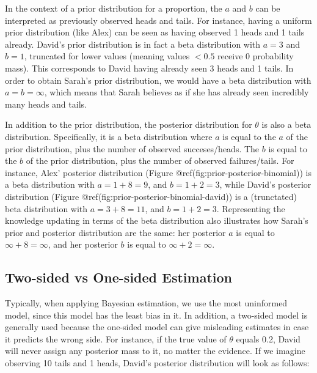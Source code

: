 \documentclass[
  letterpaper,
  DIV=11,
  numbers=noendperiod]{scrreprt}
\begin{document}
In the context of a prior distribution for a proportion, the \(a\) and
\(b\) can be interpreted as previously observed heads and tails. For
instance, having a uniform prior distribution (like Alex) can be seen as
having observed 1 heads and 1 tails already. David's prior distribution
is in fact a beta distribution with \(a = 3\) and \(b = 1\), truncated
for lower values (meaning values \(< 0.5\) receive 0 probability mass).
This corresponds to David having already seen 3 heads and 1 tails. In
order to obtain Sarah's prior distribution, we would have a beta
distribution with \(a = b = \infty\), which means that Sarah believes as
if she has already seen incredibly many heads and tails.

In addition to the prior distribution, the posterior distribution for
\(\theta\) is also a beta distribution. Specifically, it is a beta
distribution where \(a\) is equal to the \(a\) of the prior
distribution, plus the number of observed succeses/heads. The \(b\) is
equal to the \(b\) of the prior distribution, plus the number of
observed failures/tails. For instance, Alex' posterior distribution
(Figure @ref(fig:prior-posterior-binomial)) is a beta distribution with
\(a = 1 + 8 = 9\), and \(b = 1 + 2 = 3\), while David's posterior
distribution (Figure @ref(fig:prior-posterior-binomial-david)) is a
(trunctated) beta distribution with \(a = 3 + 8 = 11\), and
\(b = 1 + 2 = 3\). Representing the knowledge updating in terms of the
beta distribution also illustrates how Sarah's prior and posterior
distribution are the same: her posterior \(a\) is equal to
\(\infty + 8 = \infty\), and her posterior \(b\) is equal to
\(\infty + 2 = \infty\).

\hypertarget{two-sided-vs-one-sided-estimation}{%
\subsection{Two-sided vs One-sided
Estimation}\label{two-sided-vs-one-sided-estimation}}

Typically, when applying Bayesian estimation, we use the most uninformed
model, since this model has the least bias in it. In addition, a
two-sided model is generally used because the one-sided model can give
misleading estimates in case it predicts the wrong side. For instance,
if the true value of \(\theta\) equals 0.2, David will never assign any
posterior mass to it, no matter the evidence. If we imagine observing 10
tails and 1 heads, David's posterior distribution will look as follows:
\end{document}
